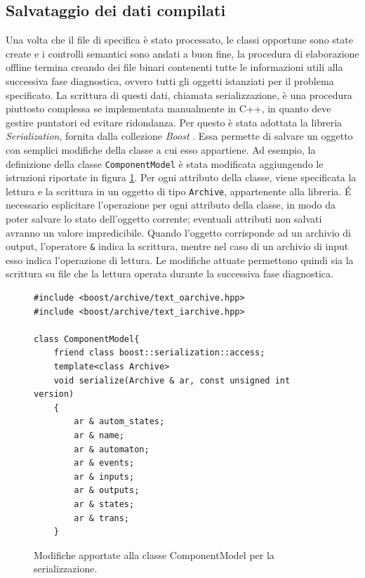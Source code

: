 \subsection{Salvataggio dei dati compilati}
Una volta che il file di specifica è stato processato, le classi opportune sono state create e i controlli semantici sono andati a buon fine, la procedura di elaborazione offline termina creando dei file binari contenenti tutte le informazioni utili alla successiva fase diagnostica, ovvero tutti gli oggetti istanziati per il problema specificato. La scrittura di questi dati, chiamata serializzazione, è una procedura piuttosto complessa se implementata manualmente in C++, in quanto deve gestire puntatori ed evitare ridondanza. Per questo è stata adottata la libreria \emph{Serialization}, fornita dalla collezione \emph{Boost} \cite{web:boost}. Essa permette di salvare un oggetto con semplici modifiche della classe a cui esso appartiene.
Ad esempio, la definizione della classe \verb|ComponentModel| è stata modificata aggiungendo le istruzioni riportate in figura \ref{code:serialize}. Per ogni attributo della classe, viene specificata la lettura e la scrittura in un oggetto di tipo \verb|Archive|, appartenente alla libreria. \'E necessario esplicitare l'operazione per ogni attributo della classe, in modo da poter salvare lo stato dell'oggetto corrente; eventuali attributi non salvati avranno un valore impredicibile. Quando l'oggetto corrisponde ad un archivio di output, l'operatore \verb|&| indica la scrittura, mentre nel caso di un archivio di input esso indica l'operazione di lettura. Le modifiche attuate permettono quindi sia la scrittura su file che la lettura operata durante la successiva fase diagnostica.

\begin{figure}[htbp]
\begin{verbatim}
#include <boost/archive/text_oarchive.hpp>
#include <boost/archive/text_iarchive.hpp>

class ComponentModel{
    friend class boost::serialization::access;
    template<class Archive>
    void serialize(Archive & ar, const unsigned int version)
    {
        ar & autom_states;
        ar & name;
        ar & automaton;
        ar & events;
        ar & inputs;
        ar & outputs;
        ar & states;
        ar & trans;
    }
\end{verbatim}
\caption{Modifiche apportate alla classe ComponentModel per la serializzazione.}
\label{code:serialize}
\end{figure}

